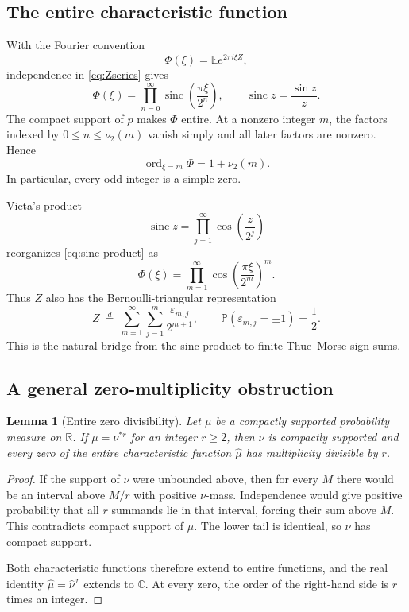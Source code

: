 \documentclass[11pt,oneside]{article}
\newtheorem{lemma}[theorem]{Lemma}
\theoremstyle{definition}
\theoremstyle{remark}
\newcommand{\R}{\mathbb R}
\newcommand{\C}{\mathbb C}
\newcommand{\sinc}{\operatorname{sinc}}
\newcommand{\E}{\mathbb E}
\newcommand{\Prob}{\mathbb P}
\DeclareMathOperator{\ord}{ord}
\newcommand{\Pp}{\Prob}
\begin{document}
\subsection{The entire characteristic function}
With the Fourier convention
\[
 \Phi(\xi)=\E e^{2\pi i\xi Z},
\]
independence in \eqref{eq:Zseries} gives
\begin{equation}\label{eq:sinc-product}
 \Phi(\xi)=\prod_{n=0}^{\infty}\sinc\!\left(\frac{\pi\xi}{2^n}\right),
 \qquad \sinc z=\frac{\sin z}{z}.
\end{equation}
The compact support of $p$ makes $\Phi$ entire.  At a nonzero integer $m$, the
factors indexed by $0\le n\le\nu_2(m)$ vanish simply and all later factors are
nonzero.  Hence
\begin{equation}\label{eq:zero-order}
 \ord_{\xi=m}\Phi=1+\nu_2(m).
\end{equation}
In particular, every odd integer is a simple zero.

Vieta's product
\[
 \sinc z=\prod_{j=1}^{\infty}\cos\!\left(\frac{z}{2^j}\right)
\]
reorganizes \eqref{eq:sinc-product} as
\begin{equation}\label{eq:cosine-triangle}
 \Phi(\xi)=\prod_{m=1}^{\infty}
 \cos\!\left(\frac{\pi\xi}{2^m}\right)^m.
\end{equation}
Thus $Z$ also has the Bernoulli-triangular representation
\begin{equation}\label{eq:bernoulli-triangle}
 Z\ \stackrel d=\ \sum_{m=1}^{\infty}\sum_{j=1}^{m}
 \frac{\varepsilon_{m,j}}{2^{m+1}},
 \qquad \Pp(\varepsilon_{m,j}=\pm1)=\frac12.
\end{equation}
This is the natural bridge from the sinc product to finite Thue--Morse sign sums.

\subsection{A general zero-multiplicity obstruction}
\begin{lemma}[Entire zero divisibility]\label{lem:zero-divisibility}
Let $\mu$ be a compactly supported probability measure on $\R$.  If
$\mu=\nu^{*r}$ for an integer $r\ge2$, then $\nu$ is compactly supported and every
zero of the entire characteristic function $\widehat\mu$ has multiplicity
divisible by $r$.
\end{lemma}

\begin{proof}
If the support of $\nu$ were unbounded above, then for every $M$ there would be an
interval above $M/r$ with positive $\nu$-mass.  Independence would give positive
probability that all $r$ summands lie in that interval, forcing their sum above
$M$.  This contradicts compact support of $\mu$.  The lower tail is identical, so
$\nu$ has compact support.

Both characteristic functions therefore extend to entire functions, and the real
identity $\widehat\mu=\widehat\nu^{\,r}$ extends to $\C$.  At every zero, the order
of the right-hand side is $r$ times an integer.
\end{proof}
\end{document}
